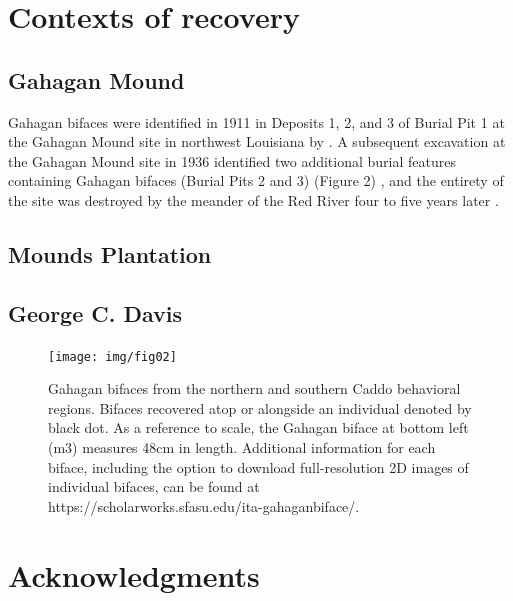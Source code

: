 \documentclass[]{interact}
\theoremstyle{plain}%
\theoremstyle{definition}
\theoremstyle{remark}
\begin{document}
\hypertarget{contexts-of-recovery}{%
\section{Contexts of recovery}\label{contexts-of-recovery}}

\hypertarget{gahagan-mound}{%
\subsection{Gahagan Mound}\label{gahagan-mound}}

Gahagan bifaces were identified in 1911 in Deposits 1, 2, and 3 of
Burial Pit 1 at the Gahagan Mound site in northwest Louisiana by
\citet[Figures 18-19, 21]{RN7107}. A subsequent excavation at the
Gahagan Mound site in 1936 identified two additional burial features
containing Gahagan bifaces (Burial Pits 2 and 3) (Figure 2)
\citep[Plate 27]{RN8176}, and the entirety of the site was destroyed by
the meander of the Red River four to five years later \citep{RN10759}.

\hypertarget{mounds-plantation}{%
\subsection{Mounds Plantation}\label{mounds-plantation}}

\hypertarget{george-c.-davis}{%
\subsection{George C. Davis}\label{george-c.-davis}}

\begin{figure}
\texttt{[image: img/fig02]} \caption{Gahagan bifaces from the northern and southern Caddo behavioral regions. Bifaces recovered atop or alongside an individual denoted by black dot. As a reference to scale, the Gahagan biface at bottom left (m3) measures 48cm in length. Additional information for each biface, including the option to download full-resolution 2D images of individual bifaces, can be found at https://scholarworks.sfasu.edu/ita-gahaganbiface/.}\label{fig:gahagan bifaces 2D}
\end{figure}

\hypertarget{acknowledgments}{%
\section*{Acknowledgments}\label{acknowledgments}}
\end{document}
